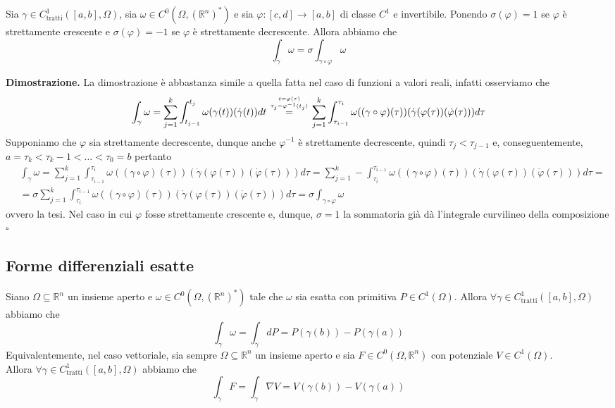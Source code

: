 \vspace{0.5cm}
\begin{theorem}[\textcolor{blue}{di invarianza}]
	Sia $\gamma \in C^1_{\text{tratti}}([a, b], \Omega)$, sia $\omega \in C^0(\Omega, (\mathbb{R}^n)^*)$ e sia $\varphi: [c, d] \to [a, b]$
	di classe $C^1$ e invertibile. Ponendo $\sigma(\varphi)= 1$ se $\varphi$ è strettamente crescente e $\sigma(\varphi)=-1$ se $\varphi$ è strettamente decrescente.
	Allora abbiamo che
	$$
		\int_\gamma \omega = \sigma \int_{\gamma \circ \varphi} \omega
	$$
	\label{thm:teo_di_invarianza}
\end{theorem}

\noindent \textbf{Dimostrazione. }
La dimostrazione è abbastanza simile a quella fatta nel caso di funzioni a valori reali, infatti osserviamo che
$$
\int_{\gamma} \omega = \sum_{j=1}^k \int_{t_{j-1}}^{t_j} \omega(\gamma(t))(\dot{\gamma}(t))dt \stackrel{t=\varphi(\tau) \atop \tau_j = \varphi^{-1}(t_j)}{=} \sum_{j=1}^k \int_{\tau_{i-1}}^{\tau_{i}} \omega((\gamma \circ \varphi)(\tau))(\dot{\gamma}(\varphi(\tau))(\dot{\varphi}(\tau)))d\tau
$$
Supponiamo che $\varphi$ sia strettamente decrescente, dunque anche $\varphi^{-1}$ è strettamente decrescente, quindi $\tau_j < \tau_{j-1}$ e, conseguentemente, $a = \tau_k < \tau_k-1 < \ldots < \tau_0 = b$ pertanto
\begin{align*}
&\int_\gamma \omega = \sum_{j=1}^k \int_{\tau_{i-1}}^{\tau_{i}} \omega((\gamma \circ \varphi)(\tau))(\dot{\gamma}(\varphi(\tau))(\dot{\varphi}(\tau)))d\tau = \sum_{j=1}^k - \int_{\tau_{i}}^{\tau_{i-1}} \omega((\gamma \circ \varphi)(\tau))(\dot{\gamma}(\varphi(\tau))(\dot{\varphi}(\tau)))d\tau = \\
&= \sigma \sum_{j=1}^k \int_{\tau_{i}}^{\tau_{i-1}} \omega((\gamma \circ \varphi)(\tau))(\dot{\gamma}(\varphi(\tau))(\dot{\varphi}(\tau)))d\tau = \sigma \int_{\gamma \circ \varphi} \omega
\end{align*}
ovvero la tesi. Nel caso in cui $\varphi$ fosse strettamente crescente e, dunque, $\sigma=1$ la sommatoria già dà l'integrale curvilineo della composizione
\hfill $\square$

\vspace{0.5cm}
\subsection{Forme differenziali esatte}
\begin{prop}
	Siano $\Omega \subseteq \mathbb{R}^n$ un insieme aperto e $\omega \in C^0(\Omega, (\mathbb{R}^n)^*)$ tale che $\omega$ sia esatta con primitiva $P \in C^1(\Omega)$.
	Allora $\forall \gamma \in C^1_{\text{tratti}}([a, b], \Omega)$ abbiamo che
	$$
		\int_{\gamma} \omega = \int_{\gamma} dP = P(\gamma(b)) - P(\gamma(a))
	$$
	\noindent Equivalentemente, nel caso vettoriale, sia sempre $\Omega \subseteq \mathbb{R}^n$ un insieme aperto e sia $F \in C^0(\Omega, \mathbb{R}^n)$ con potenziale $V \in C^1(\Omega)$. \\ Allora $\forall \gamma \in C^1_{\text{tratti}}([a, b], \Omega)$ abbiamo che
	$$
		\int_{\gamma} F = \int_{\gamma} \nabla V = V(\gamma(b)) - V(\gamma(a))
	$$
\end{prop}

